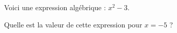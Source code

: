 
Voici une expression algébrique : $x^2-3$.

Quelle est la valeur de cette expression pour $x=-5$ ?

\smallskip
{}

